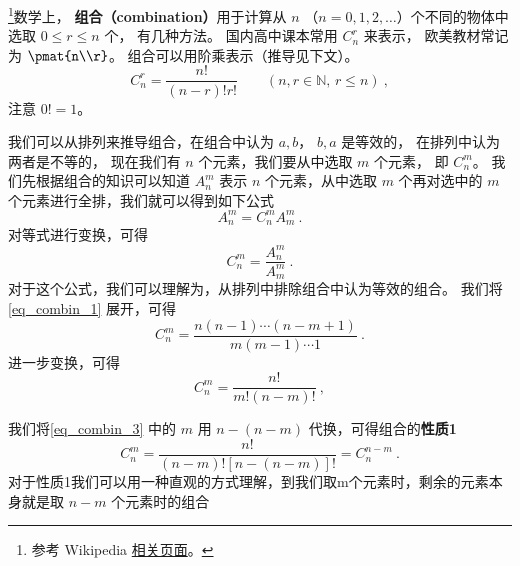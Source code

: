 
\begin{issues}
\issueDraft
\end{issues}


\footnote{参考 Wikipedia \href{https://en.wikipedia.org/wiki/Combination}{相关页面}。}数学上， \textbf{组合（combination）}用于计算从 $n$ （$n = 0, 1, 2, \dots$）个不同的物体中选取 $0 \leqslant r \leqslant n$ 个， 有几种方法。 国内高中课本常用 $C_n^r$ 来表示， 欧美教材常记为 $\pmat{n\\r}$。 组合可以用阶乘表示（推导见下文）。
\begin{equation}
C_n^r = \frac{n!}{(n-r)!r!} \qquad (n, r \in \mathbb N,\, r \leqslant n)~,
\end{equation}
注意 $0! = 1$。

我们可以从排列来推导组合，在组合中认为 ${a,b}$， ${b,a}$ 是等效的， 在排列中认为两者是不等的， 现在我们有 $n$ 个元素，我们要从中选取 $m$ 个元素， 即 $C_n^m$。
我们先根据组合的知识可以知道 $A_n^m$ 表示 $n$ 个元素，从中选取 $m$ 个再对选中的 $m$ 个元素进行全排，我们就可以得到如下公式
\begin{equation}
A_n^m = C_n^m A_m^m~.
\end{equation}
对等式进行变换，可得
\begin{equation}\label{eq_combin_1}
C_n^m = \frac{A_n^m}{A_m^m}~.
\end{equation}
对于这个公式，我们可以理解为，从排列中排除组合中认为等效的组合。
我们将\autoref{eq_combin_1} 展开，可得
\begin{equation}\label{eq_combin_2}
C_n^m = \frac{n(n - 1) \cdots (n - m + 1)}{m(m-1)\cdots 1}~.
\end{equation}
进一步变换，可得
\begin{equation}\label{eq_combin_3}
C_n^m = \frac{n!}{m!(n-m)!}~,
\end{equation}

我们将\autoref{eq_combin_3} 中的 $m$ 用 $n-(n-m)$ 代换，可得组合的\textbf{性质1}
\begin{equation}\label{eq_combin_4}
C_n^m = \frac{n!}{(n-m)![n-(n-m)]!} = C_n^{n-m}~.
\end{equation}
对于性质1我们可以用一种直观的方式理解，到我们取m个元素时，剩余的元素本身就是取 $n-m$ 个元素时的组合

